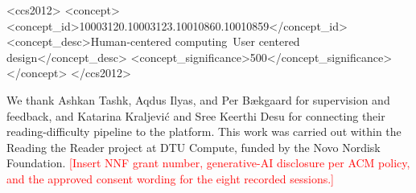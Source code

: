 \documentclass[sigconf,screen]{acmart}
\newcommand{\draftnote}[1]{\textcolor{red}{[#1]}}
\begin{document}
\begin{CCSXML}
<ccs2012>
<concept>
<concept_id>10003120.10003123.10010860.10010859</concept_id>
<concept_desc>Human-centered computing~User centered design</concept_desc>
<concept_significance>500</concept_significance>
</concept>
</ccs2012>
\end{CCSXML}


\maketitle









\begin{acks}
We thank Ashkan Tashk, Aqdus Ilyas, and Per B\ae kgaard for supervision and feedback, and Katarina Kraljevi\'{c} and Sree Keerthi Desu for connecting their reading-difficulty pipeline to the platform.
This work was carried out within the Reading the Reader project at DTU Compute, funded by the Novo Nordisk Foundation.
\draftnote{Insert NNF grant number, generative-AI disclosure per ACM policy, and the approved consent wording for the eight recorded sessions.}
\end{acks}



\end{document}
